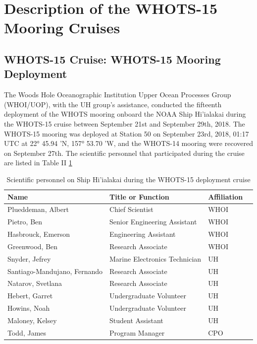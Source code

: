 \section{Description of the WHOTS-15 Mooring Cruises}

\subsection{WHOTS-15 Cruise: WHOTS-15 Mooring Deployment}

The Woods Hole Oceanographic Institution Upper Ocean Processes Group (WHOI/UOP), with the UH group's assistance, conducted the fifteenth deployment of the WHOTS mooring onboard the NOAA Ship Hi’ialakai during the WHOTS-15 cruise between September 21st and September 29th, 2018.  The WHOTS-15 mooring was deployed at Station 50 on September 23rd, 2018, 01:17 UTC at 22° 45.94 'N, 157° 53.70 'W, and the WHOTS-14 mooring were recovered on September 27th. The scientific personnel that participated during the cruise are listed in Table II \ref{tab:table_1} 



\begin{table}[hbp]

    \caption{Scientific personnel on Ship Hi’ialakai during the WHOTS-15 deployment cruise}
    
\begin{center}

\begin{tabular}{| l | l | l | l}
   
    \hline
    \textbf{Name} & \textbf{Title} or \textbf{Function} & \textbf{Affiliation} \\
    
    \hline
    Plueddeman, Albert & Chief Scientist & WHOI \\
    \hline
    Pietro, Ben &	Senior Engineering Assistant & WHOI \\
    \hline
    Hasbrouck, Emerson	 & Engineering Assistant & WHOI \\
    \hline
    Greenwood, Ben & Research Associate &	WHOI \\
    \hline
    Snyder, Jefrey & Marine Electronics Technician	& UH \\
    \hline
    Santiago-Mandujano, Fernando & Research Associate & UH \\
    \hline
    Natarov, Svetlana & Research Associate & UH \\
    \hline
    Hebert, Garret & Undergraduate Volunteer  & UH \\
    \hline
    Howins, Noah & Undergraduate Volunteer & UH \\
    \hline
    Maloney, Kelsey & Student Assistant & UH \\
    \hline
    Todd, James & Program Manager & CPO \\
    \hline

\end{tabular}

\end{center}

\label{tab:table_1}

\end{table}


